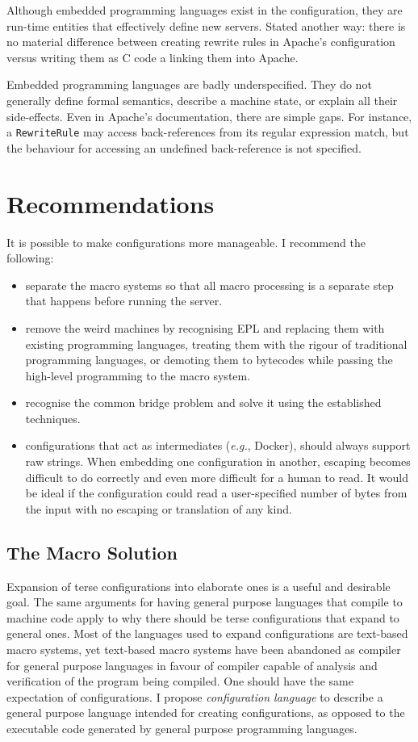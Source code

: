 \documentclass[letterpaper,twocolumn,10pt]{article}
\begin{document}
Although embedded programming languages exist in the configuration, they are run-time entities that effectively define new servers. Stated another way: there is no material difference between creating rewrite rules in Apache's configuration versus writing them as C code a linking them into Apache.

Embedded programming languages are badly underspecified. They do not generally define formal semantics, describe a machine state, or explain all their side-effects. Even in Apache's documentation, there are simple gaps. For instance, a \texttt{RewriteRule} may access back-references from its regular expression match, but the behaviour for accessing an undefined back-reference is not specified.


\section{Recommendations}
It is possible to make configurations more manageable. I recommend the following:

\begin{itemize}
\item separate the macro systems so that all macro processing is a separate step that happens before running the server.
\item remove the weird machines by recognising EPL and replacing them with existing programming languages, treating them with the rigour of traditional programming languages, or demoting them to bytecodes while passing the high-level programming to the macro system.
\item recognise the common bridge problem and solve it using the established techniques.
\item configurations that act as intermediates (\emph{e.g.}, Docker), should always support raw strings. When embedding one configuration in another, escaping becomes difficult to do correctly and even more difficult for a human to read. It would be ideal if the configuration could read a user-specified number of bytes from the input with no escaping or translation of any kind.
\end{itemize}

\subsection{The Macro Solution}
Expansion of terse configurations into elaborate ones is a useful and desirable goal. The same arguments for having general purpose languages that compile to machine code apply to why there should be terse configurations that expand to general ones. Most of the languages used to expand configurations are text-based macro systems, yet text-based macro systems have been abandoned as compiler for general purpose languages in favour of compiler capable of analysis and verification of the program being compiled. One should have the same expectation of configurations. I propose \emph{configuration language} to describe a general purpose language intended for creating configurations, as opposed to the executable code generated by general purpose programming languages.
\end{document}
